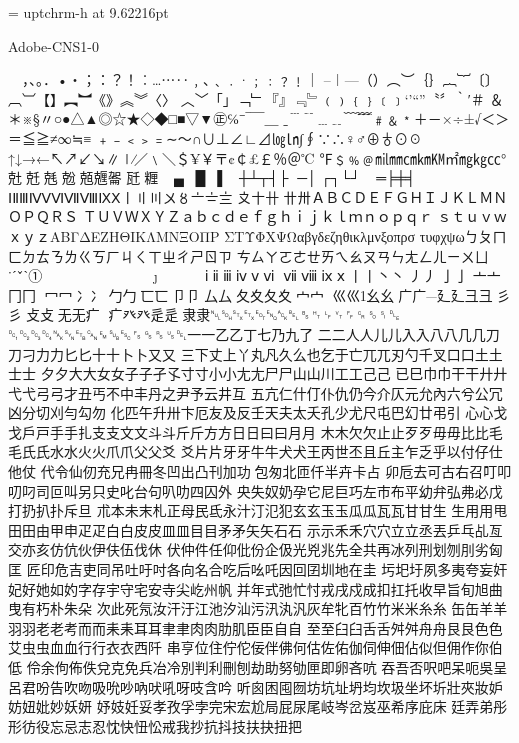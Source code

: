 %
%
%
\font\uptchrm = uptchrm-h at 9.62216pt
\uptchrm

Adobe-CNS1-0

　，、。．•‧；：？！︰…⋯‥﹐､﹑﹒·﹔﹕﹖﹗｜
–︱—（）︵︶｛｝︷︸〔〕︹︺【】︻︼《》︽︾〈〉
︿﹀「」﹁﹂『』﹃﹄﹙﹚﹛﹜﹝﹞‘’“”〝〞‵′＃
＆＊※§〃○●△▲◎☆★◇◆□■▽▼㊣℅¯̄‾￣＿
ˍ﹉﹊﹍﹎﹋﹌﹟﹠﹡＋－×÷±√＜＞＝≦≧≠∞≒≡
﹢﹣﹤﹥﹦∼～∩∪⊥∠∟⊿㏒㏑∫∮∵∴♀♂⊕♁⊙☉
↑↓→←↖↗↙↘∥∣∕／﹨＼＄¥￥〒¢￠£￡％＠℃
℉﹩﹪﹫㏕㎜㎝㎞㏎㎡㎎㎏㏄°兙兛兞兝兡兣嗧
瓩糎▁▂▃▄▅▆▇█▏▎▍▌▋▊▉┼┴┬┤├▔
─│▕┌┐└┘╭╮╰╯═╞╪╡◢◣◥◤╱╲╳０１２
３４５６７８９ⅠⅡⅢⅣⅤⅥⅦⅧⅨⅩ〡〢〣〤〥〦〧〨
〩〸卄〹〺ＡＢＣＤＥＦＧＨＩＪＫＬＭＮＯＰＱＲＳ
ＴＵＶＷＸＹＺａｂｃｄｅｆｇｈｉｊｋｌｍｎｏｐｑｒ
ｓｔｕｖｗｘｙｚΑΒΓΔΕΖΗΘΙΚΛΜΝΞΟΠΡ
ΣΤΥΦΧΨΩαβγδεζηθικλμνξοπρσ
τυφχψωㄅㄆㄇㄈㄉㄊㄋㄌㄍㄎㄏㄐㄑㄒㄓㄔㄕㄖㄗ
ㄘㄙㄚㄛㄜㄝㄞㄟㄠㄡㄢㄣㄤㄥㄦㄧㄨㄩ˙ˊˇ̌ˋ①
②③④⑤⑥⑦⑧⑨⑩⑴⑵⑶⑷
⑸⑹⑺⑻⑼⑽ⅰⅱⅲⅳⅴⅵ
ⅶⅷⅸⅹ丨⼁丶⼂丿⼃⼅亅⼇亠冂⼌
冖⼍冫⼎⼓勹⼖匸⼙卩⼛厶⼡⼢夂夊⼧宀
⼮巛幺⼳广⼴廴⼵彐⼹彡⼺⽁攴⽆无疒
⽧癶⽨⾡辵⾪隶␀␁␂␃␄␅␆␇␈␉␊␋␌␍␎␏␐
␑␒␓␔␕␖␗␘␙␚␛␜␝␞␟␡⼀一⼄乙丁七乃九了
⼆二人⼈儿⼉入⼊八⼋⼏几⼑刀刁⼒力⼔匕十⼗卜⼘⼜又
三下丈上丫丸凡久么也乞于亡兀兀刃勺千叉⼝口土⼟士⼠
夕⼣大⼤女⼥⼦子孑孓寸⼨小⼩尢⼪尸⼫⼭山川工⼯⼰己
已巳巾⼱干⼲廾⼶弋⼷弓⼸才丑丐不中丰丹之尹予云井互
五亢仁什仃仆仇仍今介仄元允內六兮公冗凶分切刈勻勾勿
化匹午升卅卞厄友及反壬天夫太夭孔少尤尺屯巴幻廿弔引
心⼼戈⼽戶⼾手⼿扎⽀支文⽂斗⽃斤⽄方⽅日⽇曰⽈月⽉
木⽊欠⽋止⽌歹⽍毋⽏比⽐毛⽑氏⽒水⽔火⽕爪⽖父⽗爻
⽘片⽚牙⽛牛⽜犬⽝王丙世丕且丘主乍乏乎以付仔仕他仗
代令仙仞充兄冉冊冬凹出凸刊加功包匆北匝仟半卉卡占
卯卮去可古右召叮叩叨叼司叵叫另只史叱台句叭叻四囚外
央失奴奶孕它尼巨巧左市布平幼弁弘弗必戊打扔扒扑斥旦
朮本未末札正母民氐永汁汀氾犯玄⽞玉⽟瓜⽠瓦⽡甘⽢生
⽣⽤用甩⽥田由甲申⽦疋白⽩皮⽪皿⽫目⽬矛⽭矢⽮石⽯
示⽰禾⽲穴⽳立⽴丞丟乒乓乩亙交亦亥仿伉伙伊伕伍伐休
伏仲件任仰仳份企伋光兇兆先全共再冰列刑划刎刖劣匈匡
匠印危吉吏同吊吐吁吋各向名合吃后吆吒因回囝圳地在圭
圬圯圩夙多夷夸妄奸妃好她如妁字存宇守宅安寺尖屹州帆
并年式弛忙忖戎戌戍成扣扛托收早旨旬旭曲曳有朽朴朱朵
次此死氖汝汗汙江池汐汕污汛汍汎灰牟牝百竹⽵米⽶糸⽷
缶⽸羊⽺羽⽻老⽼考而⽽耒⽾耳⽿聿⾀肉⾁肋肌臣⾂自⾃
至⾄臼⾅舌⾆舛⾇舟⾈艮⾉色⾊艾虫⾍血⾎行⾏衣⾐西阡
串亨位住佇佗佞伴佛何估佐佑伽伺伸佃佔似但佣作你伯低
伶余佝佈佚兌克免兵冶冷別判利刪刨劫助努劬匣即卵吝吭
吞吾否呎吧呆呃吳呈呂君吩告吹吻吸吮吵吶吠吼呀吱含吟
听囪困囤囫坊坑址坍均坎圾坐坏圻壯夾妝妒妨妞妣妙妖妍
妤妓妊妥孝孜孚孛完宋宏尬局屁尿尾岐岑岔岌巫希序庇床
廷弄弟彤形彷役忘忌志忍忱快忸忪戒我抄抗抖技扶抉扭把
